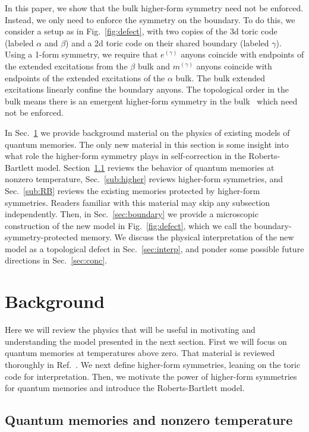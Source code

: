 In this paper, we show that the bulk higher-form symmetry need not be enforced. Instead, we only need to enforce the symmetry on the boundary. To do this, we consider a setup as in Fig.~\ref{fig:defect}, with two copies of the 3d toric code (labeled $\alpha$ and $\beta$) and a 2d toric code on their shared boundary (labeled $\gamma$). Using a 1-form symmetry, we require that $e^{(\gamma)}$ anyons coincide with endpoints of the extended excitations from the $\beta$ bulk and $m^{(\gamma)}$ anyons coincide with endpoints of the extended excitations of the $\alpha$ bulk. The bulk extended excitations linearly confine the boundary anyons. The topological order in the bulk means there is an emergent  higher-form symmetry in the bulk~\cite{Wen2019Higher} which need not be enforced.

In Sec.~\ref{sec:back} we provide background material on the physics of existing models of quantum memories. The only new material in this section is some insight into what role the higher-form symmetry plays in self-correction in the Roberts-Bartlett model. Section~\ref{sub:mems} reviews the behavior of quantum memories at nonzero temperature, Sec.~\ref{sub:higher} reviews higher-form symmetries, and Sec.~\ref{sub:RB} reviews the existing memories protected by higher-form symmetries. Readers familiar with this material may skip any subsection independently.
Then, in Sec.~\ref{sec:boundary} we provide a microscopic construction of the new model in Fig.~\ref{fig:defect}, which we call the boundary-symmetry-protected memory. We discuss the physical interpretation of the new model as a topological defect in Sec.~\ref{sec:interp}, and ponder some possible future directions in Sec.~\ref{sec:conc}.

\section{Background} \label{sec:back}

Here we will review the physics that will be useful in motivating and understanding the model presented in the next section. First we will focus on quantum memories at temperatures above zero. That material is reviewed thoroughly in Ref.~\cite{Brown2016Finite}. We next define higher-form symmetries, leaning on the toric code for interpretation. Then, we motivate the power of higher-form symmetries for quantum memories and introduce the Roberts-Bartlett model.

\subsection{Quantum memories and nonzero temperature} \label{sub:mems}


